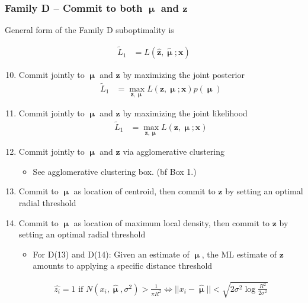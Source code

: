 \documentclass{article}
\newcommand{\mu}{\boldsymbol\upmu}
\begin{document}
\subsubsection*{Family D -- Commit to both $\mu$ and $\mathbf{z}$} 
General form of the Family D suboptimality is

\begin{align*}
    \tilde{L}_1 &= L(\mathbf{\hat{z}}, \hat{\mu};\mathbf{x})
\end{align*}
\begin{enumerate}[label=D(\arabic*)]
\setcounter{enumi}{9}
    \item Commit jointly to $\mu$ and $\mathbf{z}$ by maximizing the joint posterior
        \begin{align*}
        \tilde{L}_1 &= \underset{\mathbf{z},\mu}{\max}L(\mathbf{z},\mu;\mathbf{x})p(\mu)
        \end{align*}
    \item Commit jointly to $\mu$ and $\mathbf{z}$ by maximizing the joint likelihood
        \begin{align*}
        \tilde{L}_1 &= \underset{\mathbf{z},\mu}{\max}L(\mathbf{z},\mu;\mathbf{x})
        \end{align*}
    \item Commit jointly to $\mu$ and $\mathbf{z}$ via agglomerative clustering
    \begin{itemize}
        \item See agglomerative clustering box. ({bf Box 1.})
    \end{itemize}
    \item Commit to $\mu$ as location of centroid, then commit to $\mathbf{z}$  by setting an optimal radial threshold
    \item Commit to $\mu$ as location of maximum local density, then commit to $\mathbf{z}$  by setting an optimal radial threshold 
    \begin{itemize}
    \item For D(13) and D(14): Given an estimate of $\mu$, the ML estimate of $\mathbf{z}$ amounts to applying a specific distance threshold
    \end{itemize}
    \begin{align*}
        \hat{z_i} = 1 \text{ if } N(x_i,\hat{\mu},\sigma^2) > \frac{1}{\pi R^2} \Leftrightarrow	||x_i-\hat{\mu}|| < \sqrt{2\sigma^2 \log \frac{R^2}{2\sigma^2}}
    \end{align*}
\end{enumerate}
\end{document}
